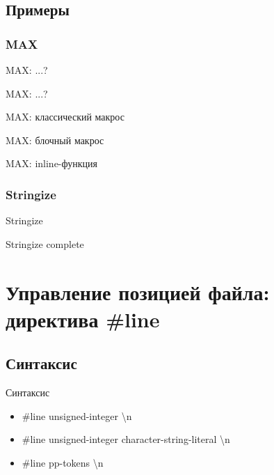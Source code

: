     \subsection{Примеры}
    \subsubsection{MAX}
    \begin{frame}{MAX: ...?}
        
    \end{frame}
    \begin{frame}{MAX: ...?}
        
    \end{frame}
    \begin{frame}{MAX: классический макрос}
        
    \end{frame}
    \begin{frame}{MAX: блочный макрос}
        
    \end{frame}
    \begin{frame}{MAX: inline-функция}
        
    \end{frame}
    \subsubsection{Stringize}
    \begin{frame}{Stringize}
        
    \end{frame}
    \begin{frame}{Stringize complete}
        
    \end{frame}

    \section{Управление позицией файла: директива \#line}
    \subsection{Синтаксис}
    \begin{frame}{Синтаксис}
        \begin{itemize}
            \item \#line unsigned-integer \textbackslash{n}
            \item \#line unsigned-integer character-string-literal \textbackslash{n}
            \item \#line pp-tokens \textbackslash{n}
        \end{itemize}
    \end{frame}
